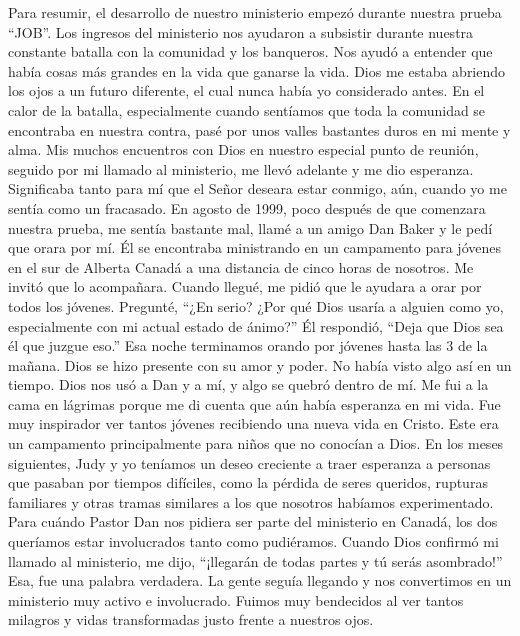 \documentclass[twoside, 12pt]{book}
\begin{document}
Para resumir, el desarrollo de nuestro ministerio empezó durante nuestra prueba “JOB”.  Los ingresos del ministerio nos ayudaron a subsistir durante nuestra constante batalla con la comunidad y los banqueros. Nos ayudó a entender que había cosas más grandes en la vida que ganarse la vida. Dios me estaba abriendo los ojos a un futuro diferente, el cual nunca había yo considerado antes. En el calor de la batalla, especialmente cuando sentíamos que toda la comunidad se encontraba en nuestra contra, pasé por unos valles bastantes duros en mi mente y alma. Mis muchos encuentros con Dios en nuestro especial punto de reunión, seguido por mi llamado al ministerio, me llevó adelante y me dio esperanza. Significaba tanto para mí que el Señor deseara estar conmigo, aún, cuando yo me sentía como un fracasado. En agosto de 1999, poco después de que comenzara nuestra prueba, me sentía bastante mal, llamé a un amigo Dan Baker y le pedí que orara por mí. Él se encontraba ministrando en un campamento para jóvenes en el sur de Alberta Canadá a una distancia de cinco horas de nosotros. Me invitó que lo acompañara. Cuando llegué, me pidió que le ayudara a orar por todos los jóvenes. Pregunté, “¿En serio? ¿Por qué Dios usaría a alguien como yo, especialmente con mi actual estado de ánimo?” Él respondió, “Deja que Dios sea él que juzgue eso.” Esa noche terminamos orando por jóvenes hasta las 3 de la mañana. Dios se hizo presente con su amor y poder. No había visto algo así en un tiempo. Dios nos usó a Dan y a mí, y algo se quebró dentro de mí. Me fui a la cama en lágrimas porque me di cuenta que aún había esperanza en mi vida. Fue muy inspirador ver tantos jóvenes recibiendo una nueva vida en Cristo. Este era un campamento principalmente para niños que no conocían a Dios. En los meses siguientes, Judy y yo teníamos un deseo creciente a traer esperanza a personas que pasaban por tiempos difíciles, como la pérdida de seres queridos, rupturas familiares y otras tramas similares a los que nosotros habíamos experimentado. Para cuándo Pastor Dan nos pidiera ser parte del ministerio en Canadá, los dos queríamos estar involucrados tanto como pudiéramos. Cuando Dios confirmó mi llamado al ministerio, me dijo, “¡llegarán de todas partes y tú serás asombrado!” Esa, fue una palabra verdadera. La gente seguía llegando y nos convertimos en un ministerio muy activo e involucrado. Fuimos muy bendecidos al ver tantos milagros y vidas transformadas justo frente a nuestros ojos.\\
\end{document}
